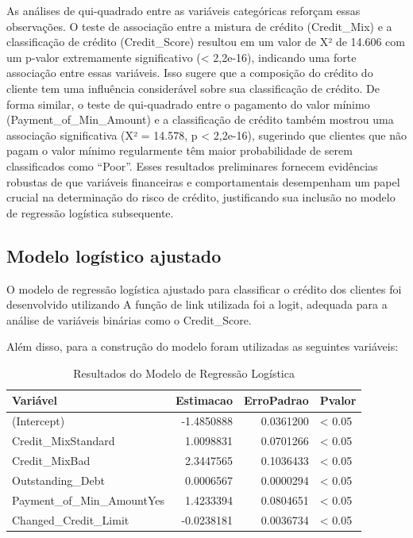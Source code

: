 \documentclass[
  letterpaper,
  DIV=11,
  numbers=noendperiod]{scrreprt}
\begin{document}
As análises de qui-quadrado entre as variáveis categóricas reforçam
essas observações. O teste de associação entre a mistura de crédito
(Credit\_Mix) e a classificação de crédito (Credit\_Score) resultou em
um valor de X² de 14.606 com um p-valor extremamente significativo
(\textless{} 2,2e-16), indicando uma forte associação entre essas
variáveis. Isso sugere que a composição do crédito do cliente tem uma
influência considerável sobre sua classificação de crédito. De forma
similar, o teste de qui-quadrado entre o pagamento do valor mínimo
(Payment\_of\_Min\_Amount) e a classificação de crédito também mostrou
uma associação significativa (X² = 14.578, p \textless{} 2,2e-16),
sugerindo que clientes que não pagam o valor mínimo regularmente têm
maior probabilidade de serem classificados como ``Poor''. Esses
resultados preliminares fornecem evidências robustas de que variáveis
financeiras e comportamentais desempenham um papel crucial na
determinação do risco de crédito, justificando sua inclusão no modelo de
regressão logística subsequente.

\subsection{Modelo logístico
ajustado}\label{modelo-loguxedstico-ajustado}

O modelo de regressão logística ajustado para classificar o crédito dos
clientes foi desenvolvido utilizando A função de link utilizada foi a
logit, adequada para a análise de variáveis binárias como o
Credit\_Score.

Além disso, para a construção do modelo foram utilizadas as seguintes
variáveis:

\begin{longtable}[t]{lrrl}
\caption{\label{tab:unnamed-chunk-33}Resultados do Modelo de Regressão Logística}\\
\toprule
Variável & Estimacao & ErroPadrao & Pvalor\\
\midrule
(Intercept) & -1.4850888 & 0.0361200 & < 0.05\\
Credit\_MixStandard & 1.0098831 & 0.0701266 & < 0.05\\
Credit\_MixBad & 2.3447565 & 0.1036433 & < 0.05\\
Outstanding\_Debt & 0.0006567 & 0.0000294 & < 0.05\\
Payment\_of\_Min\_AmountYes & 1.4233394 & 0.0804651 & < 0.05\\
\addlinespace
Changed\_Credit\_Limit & -0.0238181 & 0.0036734 & < 0.05\\
\bottomrule
\end{longtable}
\end{document}
